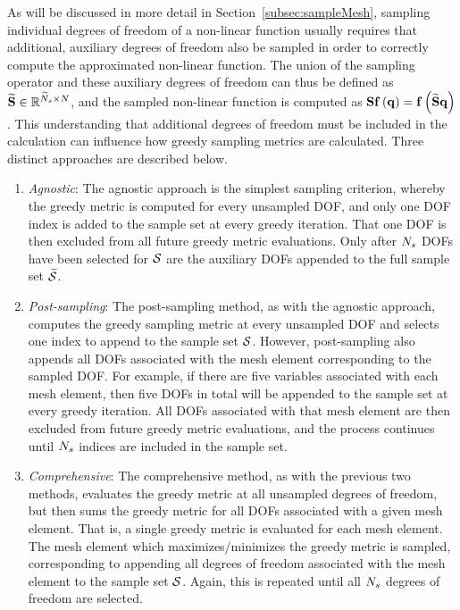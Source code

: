 As will be discussed in more detail in Section~\ref{subsec:sampleMesh}, sampling individual degrees of freedom of a non-linear function usually requires that additional, auxiliary degrees of freedom also be sampled in order to correctly compute the approximated non-linear function. The union of the sampling operator and these auxiliary degrees of freedom can thus be defined as $\mathbf{\widetilde{S}} \in \mathbb{R}^{\widetilde{N}_s \times N}$, and the sampled non-linear function is computed as $\mathbf{S} \mathbf{f} \left(\mathbf{q}\right) = \mathbf{f} \left(\mathbf{\widetilde{S}} \mathbf{q}\right)$. This understanding that additional degrees of freedom must be included in the calculation can influence how greedy sampling metrics are calculated. Three distinct approaches are described below.

\begin{enumerate}
	\item \textit{Agnostic}: The agnostic approach is the simplest sampling criterion, whereby the greedy metric is computed for every unsampled DOF, and only one DOF index is added to the sample set at every greedy iteration. That one DOF is then excluded from all future greedy metric evaluations. Only after $N_s$ DOFs have been selected for $\mathcal{S}$ are the auxiliary DOFs appended to the full sample set $\mathcal{\widetilde{S}}$.
	\item \textit{Post-sampling}: The post-sampling method, as with the agnostic approach, computes the greedy sampling metric at every unsampled DOF and selects one index to append to the sample set $\mathcal{S}$. However, post-sampling also appends all DOFs associated with the mesh element corresponding to the sampled DOF. For example, if there are five variables associated with each mesh element, then five DOFs in total will be appended to the sample set at every greedy iteration. All DOFs associated with that mesh element are then excluded from future greedy metric evaluations, and the process continues until $N_s$ indices are included in the sample set.
	\item \textit{Comprehensive}: The comprehensive method, as with the previous two methods, evaluates the greedy metric at all unsampled degrees of freedom, but then sums the greedy metric for all DOFs associated with a given mesh element. That is, a single greedy metric is evaluated for each mesh element. The mesh element which maximizes/minimizes the greedy metric is sampled, corresponding to appending all degrees of freedom associated with the mesh element to the sample set $\mathcal{S}$. Again, this is repeated until all $N_s$ degrees of freedom are selected.
\end{enumerate}

